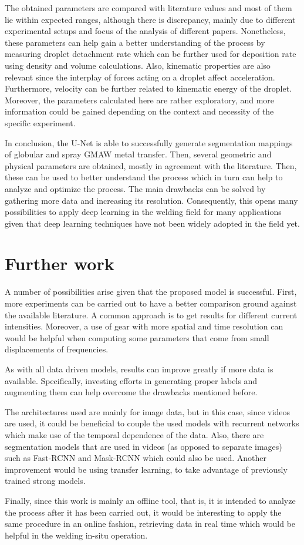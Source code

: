 The obtained parameters are compared with literature values and most of them lie within expected ranges, although there is discrepancy, mainly due to different experimental setups and focus of the analysis of different papers. Nonetheless, these parameters can help gain a better understanding of the process by measuring droplet detachment rate which can be further used for deposition rate using density and volume calculations. Also, kinematic properties are also relevant since the interplay of forces acting on a droplet affect acceleration. Furthermore, velocity can be further related to kinematic energy of the droplet. Moreover, the parameters calculated here are rather exploratory, and more information could be gained depending on the context and necessity of the specific experiment.

In conclusion, the U-Net is able to successfully generate segmentation mappings of globular and spray GMAW metal transfer. Then, several geometric and physical parameters are obtained, mostly in agreement with the literature. Then, these can be used to better understand the process which in turn can help to analyze and optimize the process. The main drawbacks can be solved by gathering more data and increasing its resolution. Consequently, this opens many possibilities to apply deep learning in the welding field for many applications given that deep learning techniques have not been widely adopted in the field yet.


\section{Further work}

A number of possibilities arise given that the proposed model is successful. First, more experiments can be carried out to have a better comparison ground against the available literature. A common approach is to get results for different current intensities. Moreover, a use of gear with more spatial and time resolution can would be helpful when computing some parameters that come from small displacements of frequencies.

As with all data driven models, results can improve greatly if more data is available. Specifically, investing efforts in generating proper labels and augmenting them can help overcome the drawbacks mentioned before.

The architectures used are mainly for image data, but in this case, since videos are used, it could be beneficial to couple the used models with recurrent networks which make use of the temporal dependence of the data. Also, there are segmentation models that are used in videos (as opposed to separate images) such as Fast-RCNN and Mask-RCNN which could also be used. Another improvement would be using transfer learning, to take advantage of previously trained strong models.

Finally, since this work is mainly an offline tool, that is, it is intended to analyze the process after it has been carried out, it would be interesting to apply the same procedure in an online fashion, retrieving data in real time which would be helpful in the welding in-situ operation.
